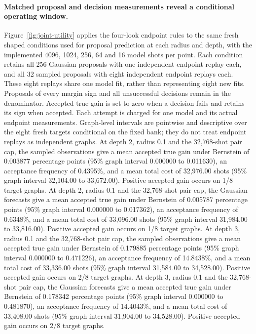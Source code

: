 {\paragraph{Matched proposal and decision measurements reveal a conditional operating window.}
Figure~\ref{fig:joint-utility} applies the four-look endpoint rules to the same fresh shaped conditions used for proposal prediction at each radius and depth, with the implemented 4096, 1024, 256, 64 and 16 model shots per point. Each condition retains all 256 Gaussian proposals with one independent endpoint replay each, and all 32 sampled proposals with eight independent endpoint replays each. These eight replays share one model fit, rather than representing eight new fits. Proposals of every margin sign and all unsuccessful decisions remain in the denominator. Accepted true gain is set to zero when a decision fails and retains its sign when accepted. Each attempt is charged for one model and its actual endpoint measurements. Graph-level intervals are pointwise and descriptive over the eight fresh targets conditional on the fixed bank; they do not treat endpoint replays as independent graphs.
At depth 2, radius 0.1 and the 32,768-shot pair cap, the sampled observations give a mean accepted true gain under Bernstein of 0.003877 percentage points (95\% graph interval 0.000000 to 0.011630), an acceptance frequency of 0.4395\%, and a mean total cost of 32,976.00 shots (95\% graph interval 32,104.00 to 33,672.00). Positive accepted gain occurs on 1/8 target graphs.
At depth 2, radius 0.1 and the 32,768-shot pair cap, the Gaussian forecasts give a mean accepted true gain under Bernstein of 0.005787 percentage points (95\% graph interval 0.000000 to 0.017362), an acceptance frequency of 0.6348\%, and a mean total cost of 33,096.00 shots (95\% graph interval 31,984.00 to 33,816.00). Positive accepted gain occurs on 1/8 target graphs.
At depth 3, radius 0.1 and the 32,768-shot pair cap, the sampled observations give a mean accepted true gain under Bernstein of 0.179885 percentage points (95\% graph interval 0.000000 to 0.471226), an acceptance frequency of 14.8438\%, and a mean total cost of 33,336.00 shots (95\% graph interval 31,584.00 to 34,528.00). Positive accepted gain occurs on 2/8 target graphs.
At depth 3, radius 0.1 and the 32,768-shot pair cap, the Gaussian forecasts give a mean accepted true gain under Bernstein of 0.178342 percentage points (95\% graph interval 0.000000 to 0.481870), an acceptance frequency of 14.4043\%, and a mean total cost of 33,408.00 shots (95\% graph interval 31,904.00 to 34,528.00). Positive accepted gain occurs on 2/8 target graphs.
}
